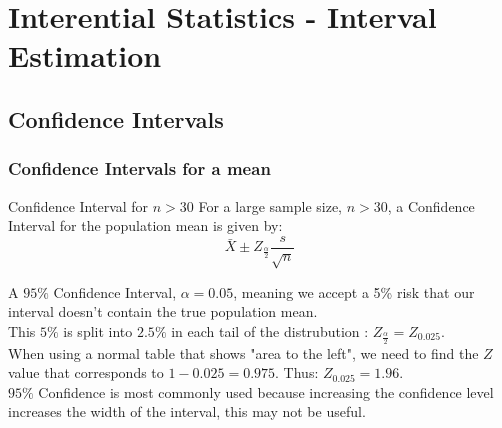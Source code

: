 \documentclass[a4paper, 10pt]{article}
\begin{document}
\section{Interential Statistics - Interval Estimation}
\subsection{Confidence Intervals}
\subsubsection{Confidence Intervals for a mean}

\begin{definitionbox}{Confidence Interval for $n > 30$}{}
    For a large sample size, $n > 30$, a Confidence Interval for the population mean is given by:
    $$\bar{X} \pm Z_{\frac{\alpha}{2}} \frac{s}{\sqrt{n}}$$
\end{definitionbox}
\noindent  A $95\%$ Confidence Interval, $\alpha = 0.05$, meaning we accept a 5\% risk that our interval doesn't contain the true population mean. \\
This $5\%$ is split into $2.5\%$ in each tail of the distrubution : $Z_{\frac{\alpha}{2}} = Z_{0.025}$. \\
When using a normal table that shows "area to the left", we need to find the $Z$ value that corresponds to $1 - 0.025 = 0.975$.
Thus: $Z_{0.025} = 1.96$. \\
$95 \%$ Confidence is most commonly used because increasing the confidence level increases the width of the interval, this may not be useful.
\end{document}
